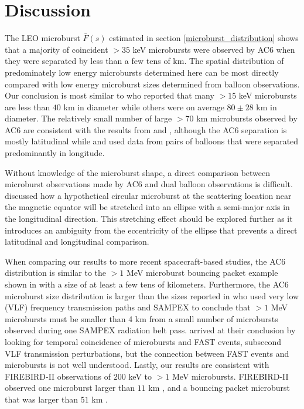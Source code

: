 \documentclass[draft]{agujournal2019}
\begin{document}
\section{Discussion} \label{discussion}
The LEO microburst $\bar{F}(s)$ estimated in section \ref{microburst_distribution} shows that a majority of coincident $>35$ keV microbursts were observed by AC6 when they were separated by less than a few tens of km. The spatial distribution of predominately low energy microbursts determined here can be most directly compared with low energy microburst sizes determined from balloon observations. Our conclusion is most similar to  who reported that many $> 15$ keV microbursts are less than $40$ km in diameter while others were on average $80 \pm 28$ km in diameter. The relatively small number of large $> 70$ km microbursts observed by AC6 are consistent with the results from  and , although the AC6 separation is mostly latitudinal while  and  used data from pairs of balloons that were separated predominantly in longitude. 

Without knowledge of the microburst shape, a direct comparison between microburst observations made by AC6 and dual balloon observations is difficult.  discussed how a hypothetical circular microburst at the scattering location near the magnetic equator will be stretched into an ellipse with a semi-major axis in the longitudinal direction. This stretching effect should be explored further as it introduces an ambiguity from the eccentricity of the ellipse that prevents a direct latitudinal and longitudinal comparison.

When comparing our results to more recent spacecraft-based studies, the AC6 distribution is similar to the $> 1$ MeV microburst bouncing packet example shown in  with a size of at least a few tens of kilometers. Furthermore, the AC6 microburst size distribution is larger than the sizes reported in  who used very low (VLF) frequency transmission paths and SAMPEX to conclude that $>1$ MeV microbursts must be smaller than 4 km from a small number of microbursts observed during one SAMPEX radiation belt pass.  arrived at their conclusion by looking for temporal coincidence of microbursts and FAST events, subsecond VLF transmission perturbations, but the connection between FAST events and microbursts is not well understood. Lastly, our results are consistent with FIREBIRD-II observations of $200$ keV to $>1$ MeV microbursts. FIREBIRD-II observed one microburst larger than $11$ km \cite{Crew2016}, and a bouncing packet microburst that was larger than $51$ km \cite{Shumko2018a}.
\end{document}
